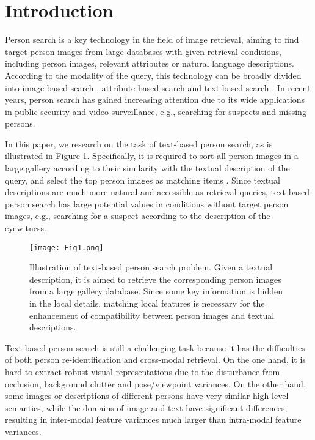 \documentclass[review]{elsarticle}
\begin{document}
\section{Introduction}
Person search is a key technology in the field of image retrieval, aiming to find target person images from large databases with given retrieval conditions, including person images, relevant attributes or natural language descriptions. According to the modality of the query, this technology can be broadly divided into image-based search \cite{1, 2, 3}, attribute-based search \cite{4, 5, 6} and text-based search \cite{7, 8, 9}. In recent years, person search has gained increasing attention due to its wide applications in public security and video surveillance, e.g., searching for suspects and missing persons.

In this paper, we research on the task of text-based person search, as is illustrated in Figure \ref{fig1}. Specifically, it is required to sort all person images in a large gallery according to their similarity with the textual description of the query, and select the top person images as matching items \cite{7}. Since textual descriptions are much more natural and accessible as retrieval queries, text-based person search has large potential values in conditions without target person images, e.g., searching for a suspect according to the description of the eyewitness.

\begin{figure}[!t]
\centering
\texttt{[image: Fig1.png]}\\
\caption{Illustration of text-based person search problem. Given a textual description, it is aimed to retrieve the corresponding person images from a large gallery database. Since some key information is hidden in the local details, matching local features is necessary for the enhancement of compatibility between person images and textual descriptions.}
\label{fig1}
\end{figure}

Text-based person search is still a challenging task because it has the difficulties of both person re-identification and cross-modal retrieval. On the one hand, it is hard to extract robust visual representations due to the disturbance from occlusion, background clutter and pose/viewpoint variances. On the other hand, some images or descriptions of different persons have very similar high-level semantics, while the domains of image and text have significant differences, resulting in inter-modal feature variances much larger than intra-modal feature variances.
\end{document}
